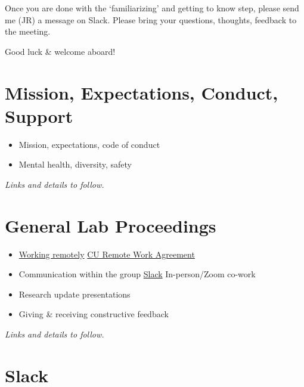 \documentclass[
  letterpaper,
  DIV=11,
  numbers=noendperiod]{scrreprt}
\providecommand{\tightlist}{%
  \setlength{\itemsep}{0pt}\setlength{\parskip}{0pt}}\usepackage{longtable,booktabs,array}
\begin{document}
Once you are done with the `familiarizing' and getting to know step,
please send me (JR) a message on Slack. Please bring your questions,
thoughts, feedback to the meeting.

Good luck \& welcome aboard! 🎉


\hypertarget{mission-expectations-conduct-support}{%
\chapter{Mission, Expectations, Conduct,
Support}\label{mission-expectations-conduct-support}}

\begin{itemize}
\tightlist
\item
  Mission, expectations, code of conduct
\item
  Mental health, diversity, safety
\end{itemize}

\emph{Links and details to follow.}


\hypertarget{general-lab-proceedings}{%
\chapter{General Lab Proceedings}\label{general-lab-proceedings}}

\begin{itemize}
\tightlist
\item
  \href{https://github.com/JRaviLab/group/blob/master/docs/howto_work_remotely.md}{Working
  remotely} \textbar{}
  \href{https://app.smartsheet.com/b/form/f5c5dd3f01dc4eefb3711a4fce6955fe}{CU
  Remote Work Agreement}
\item
  Communication within the group \textbar{}
  \href{https://jravilab.slack.com}{Slack} \textbar{} In-person/Zoom
  co-work
\item
  Research update presentations
\item
  Giving \& receiving constructive feedback
\end{itemize}

\emph{Links and details to follow.}


\hypertarget{slack}{%
\chapter{Slack}\label{slack}}
\end{document}
